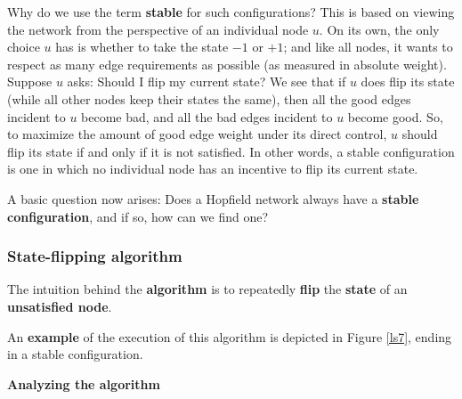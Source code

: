 


Why do we use the term \textbf{stable} for such configurations? This is based on viewing the network from the perspective of an individual node $u$. On its own, the only choice $u$ has is whether to take the state $-1$ or $+1$; and like all nodes, it wants to respect as many edge requirements as possible (as measured in absolute weight). Suppose $u$ asks: Should I flip my current state? We see that if $u$ does flip its state (while all other nodes keep their states the same), then all the good edges incident to $u$ become bad, and all the bad edges incident to $u$ become good. So, to maximize the amount of good edge weight under its direct control, $u$ should flip its state if and only if it is not satisfied. In other words, a stable configuration is one in which no individual node has an incentive to flip its current state. 

A basic question now arises: Does a Hopfield network always have a \textbf{stable configuration}, and if so, how can we find one?

\subsubsection{State-flipping algorithm}
The intuition behind the \textbf{algorithm} is to repeatedly \textbf{flip} the \textbf{state} of an \textbf{unsatisfied node}.


An \textbf{example} of the execution of this algorithm is depicted in Figure \ref{ls7}, ending in a stable configuration.

\label{ls7}

\vspace{10mm}
\textbf{Analyzing the algorithm}


